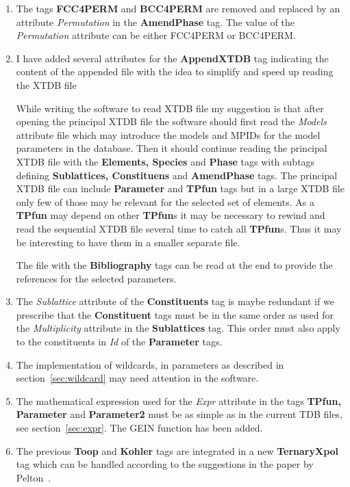 \documentclass{article}
\begin{document}
\begin{appendices}
\begin{enumerate}
\item The tags {\bf FCC4PERM} and {\bf BCC4PERM} are removed and
  replaced by an attribute {\em Permutation} in the {\bf AmendPhase}
  tag.  The value of the {\em Permutation} attribute can be either
  FCC4PERM or BCC4PERM.

\item I have added several attributes for the {\bf AppendXTDB} tag
  indicating the content of the appended file with the idea to
  simplify and speed up reading the XTDB file

  While writing the software to read XTDB file my suggestion is that
  after opening the principal XTDB file the software should first read
  the {\em Models} attribute file which may introduce the models and
  MPIDs for the model parameters in the database.  Then it should
  continue reading the principal XTDB file with the {\bf Elements,
    Species} and {\bf Phase} tags with subtags defining {\bf
    Sublattices, Constituens} and {\bf AmendPhase} tags.  The
  principal XTDB file can include {\bf Parameter} and {\bf TPfun} tags
  but in a large XTDB file only few of those may be relevant for the
  selected set of elements.  As a {\bf TPfun} may depend on other {\bf
    TPfun}s it may be necessary to rewind and read the sequential XTDB
  file several time to catch all {\bf TPfun}s.  Thus it may be
  interesting to have them in a smaller separate file.

  The file with the {\bf Bibliography} tags can be read at the end to
  provide the references for the selected parameters.

\item The {\em Sublattice} attribute of the {\bf Constituents} tag is
  maybe redundant if we prescribe that the {\bf Constituent} tags must
  be in the same order as used for the {\em Multiplicity} attribute in
  the {\bf Sublattices} tag.  This order must also apply to the
  constituents in {\em Id} of the {\bf Parameter} tags.

\item The implementation of wildcards, in parameters as described in
  section~\ref{sec:wildcard} may need attention in the software.

\item The mathematical expression used for the {\em Expr} attribute in
  the tags {\bf TPfun, Parameter} and {\bf Parameter2} must be as
  simple as in the current TDB files, see section~\ref{sec:expr}.  The
  GEIN function has been added.

\item The previous {\bf Toop} and {\bf Kohler} tags are integrated in
  a new {\bf TernaryXpol} tag which can be handled according to the
  suggestions in the paper by Pelton~\cite{01Pel}.


\end{enumerate}
\end{appendices}
\end{document}

